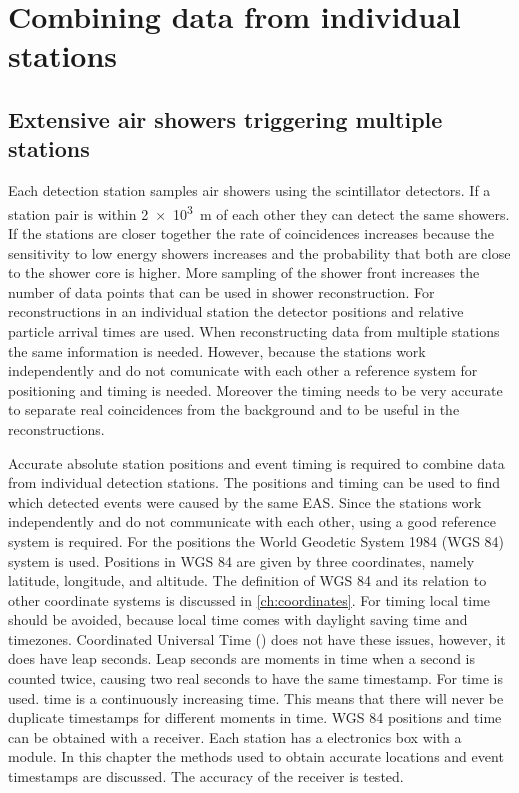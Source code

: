 \chapter{Combining data from individual stations}
\label{ch:cluster}


\section{Extensive air showers triggering multiple stations}

Each detection station samples air showers using the scintillator detectors. If a station pair is within \SI{2e3}{\meter} of each other they can detect the same showers. If the stations are closer together the rate of coincidences increases because the sensitivity to low energy showers increases and the probability that both are close to the shower core is higher. More sampling of the shower front increases the number of data points that can be used in shower reconstruction. For reconstructions in an individual station the detector positions and relative particle arrival times are used. When reconstructing data from multiple stations the same information is needed. However, because the stations work independently and do not comunicate with each other a reference system for positioning and timing is needed. Moreover the timing needs to be very accurate to separate real coincidences from the background and to be useful in the reconstructions.

Accurate absolute station positions and event timing is required to combine data from individual detection stations. The positions and timing can be used to find which detected events were caused by the same EAS. Since the stations work independently and do not communicate with each other, using a good reference system is required. For the positions the World Geodetic System 1984 (WGS 84) system is used. Positions in WGS 84 are given by three coordinates, namely latitude, longitude, and altitude. The definition of WGS 84 and its relation to other coordinate systems is discussed in \cref{ch:coordinates}. For timing local time should be avoided, because local time comes with daylight saving time and timezones. Coordinated Universal Time (\utc) does not have these issues, however, it does have leap seconds. Leap seconds are moments in time when a second is counted twice, causing two real seconds to have the same timestamp. For \hisparc \gps time is used. \gps time is a continuously increasing time. This means that there will never be duplicate timestamps for different moments in time. WGS 84 positions and \gps time can be obtained with a \gps receiver. Each station has a \hisparc electronics box with a \gps module. In this chapter the methods used to obtain accurate \gps locations and event timestamps are discussed. The accuracy of the \gps receiver is tested.


